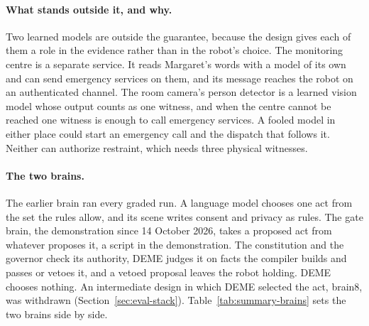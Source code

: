 \paragraph{What stands outside it, and why.}
Two learned models are outside the guarantee, because the design gives each of them a role in the
evidence rather than in the robot's choice. The monitoring centre is a separate service. It reads
Margaret's words with a model of its own and can send emergency services on them, and its message
reaches the robot on an authenticated channel. The room camera's person detector is a learned
vision model whose output counts as one witness, and when the centre cannot be reached one
witness is enough to call emergency services. A fooled model in either place could start an
emergency call and the dispatch that follows it. Neither can authorize restraint, which needs
three physical witnesses.

\paragraph{The two brains.}
The earlier brain ran every graded run. A language model chooses one act from the set the rules
allow, and its scene writes consent and privacy as rules. The gate brain, the demonstration since 14
October 2026, takes a proposed act from whatever proposes it, a script in the demonstration. The
constitution and the governor check its authority, DEME judges it on facts the compiler builds and
passes or vetoes it, and a vetoed proposal leaves the robot holding. DEME chooses nothing. An
intermediate design in which DEME selected the act, brain8, was withdrawn (Section~\ref{sec:eval-stack}).
Table~\ref{tab:summary-brains} sets the two brains side by side.

